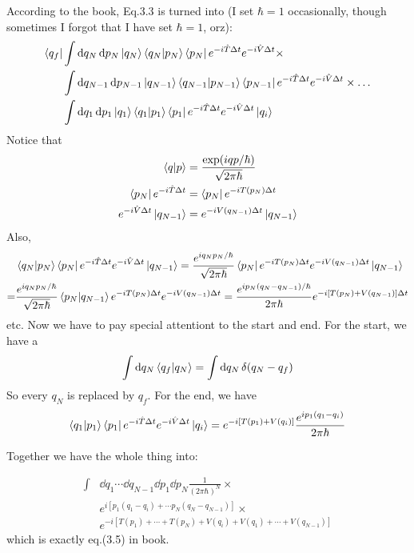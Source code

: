 \documentclass{article}
\begin{document}
According to the book, Eq.3.3 is turned into (I set $\hbar=1$ occasionally,
though sometimes I forgot that I have set $\hbar=1$, orz):
\begin{align}
    \bra{q_f} 
    &\int \dd{q_N}\dd{p_N}\ket{q_N}\braket{q_N|p_N}\bra{p_N}
        e^{-i\hat{T}\Delta t}e^{-i\hat{V}\Delta t}\times \nonumber\\
    &   \int \dd{q_{N-1}}\dd{p_{N-1}}\ket{q_{N-1}}\braket{q_{N-1}|p_{N-1}}\bra{p_{N-1}}
        e^{-i\hat{T}\Delta t}e^{-i\hat{V}\Delta t} \times
        \dots \nonumber\\
    &   \int \dd{q_1}\dd{p_1}\ket{q_1}\braket{q_1|p_1}\bra{p_1}
        e^{-i\hat{T}\Delta t}e^{-i\hat{V}\Delta t} \ket{q_i}
\end{align}
Notice that
\begin{align}
    \braket{q|p} &= \frac{\exp(iqp/\hbar)}{\sqrt{2\pi\hbar}} \\
    \bra{p_N}e^{-i\hat{T}\Delta t} &= \bra{p_N}e^{-iT(p_N)\Delta t} \\
    e^{-i\hat{V}\Delta t}\ket{q_{N-1}} &= e^{-iV(q_{N-1})\Delta t}\ket{q_{N-1}} \\
\end{align}
Also, 
\begin{align}
    &\braket{q_N|p_N}\bra{p_N}e^{-i\hat{T}\Delta t}e^{-i\hat{V}\Delta t}\ket{q_{N-1}} 
    = \frac{e^{iq_N p_N/\hbar}}{\sqrt{2\pi\hbar}}
        \bra{p_N}e^{-iT(p_N)\Delta t} e^{-iV(q_{N-1})\Delta t}\ket{q_{N-1}}
    \nonumber\\
    =& \frac{e^{iq_N p_N/\hbar}}{\sqrt{2\pi\hbar}}
        \braket{p_N | q_{N-1}}e^{-iT(p_N)\Delta t} e^{-iV(q_{N-1})\Delta t}
    = \frac{e^{ip_N (q_N-q_{N-1})/\hbar}}{2\pi\hbar}
        e^{-i[T(p_N)+V(q_{N-1})]\Delta t} 
\end{align}
etc. Now we have to pay special attentiont to the start and end. For the start,
we have a
$$ \int \dd{q_N} \braket{q_f | q_N} = \int\dd{q_N}\delta(q_N-q_f) $$
So every $q_N$ is replaced by $q_f$. For the end, we have
$$ \braket{q_1|p_1}\bra{p_1}e^{-i\hat{T}\Delta t}e^{-i\hat{V}\Delta t} \ket{q_i}
= e^{-i[T(p_1)+V(q_i)]}\frac{e^{ip_1(q_1-q_i)}}{2\pi\hbar}
$$

Together we have the whole thing into:

\begin{align}
    \int & \dd{q_1}\cdots\dd{q_{N-1}}\dd{p_1}\dd{p_N} \frac{1}{(2\pi\hbar)^N}
    \times \nonumber\\
  & e^{i\left[p_1(q_1-q_i)+\cdots p_N(q_N-q_{N-1})\right]} \times\nonumber\\
  & e^{-i\left[T(p_1)+\cdots+T(p_N)+V(q_i)+V(q_1)+\cdots+V(q_{N-1})\right]}
\end{align}
which is exactly eq.(3.5) in book.
\end{document}
